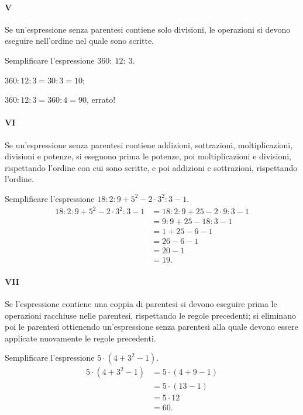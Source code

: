 \paragraph {V} Se un'espressione senza parentesi contiene solo divisioni, le operazioni si devono eseguire
nell'ordine nel quale sono scritte.
\begin{exrig}
 \begin{esempio}
 Semplificare l'espressione $360:~12:~3$.
 \begin{itemize*}
 \item $360:12:3=30:3=10$;
 \item $360:12:3=360:4=90$, errato!
\end{itemize*}
 \end{esempio}
\end{exrig}

\paragraph {VI} Se un'espressione senza parentesi contiene addizioni, sottrazioni, moltiplicazioni, divisioni e
potenze, si eseguono prima le potenze, poi moltiplicazioni e divisioni, rispettando l'ordine con cui sono
scritte, e poi addizioni e sottrazioni, rispettando l'ordine.
\pagebreak
\begin{exrig}
 \begin{esempio}
Semplificare l'espressione $18:2:9+5^2-2\cdot3^2:3-1$.
 \begin{align*}
 18:2:9+5^2-2\cdot3^2:3-1&=18:2:9+25-2\cdot 9:3-1\\
			 &=9:9+25-18:3-1\\
			 &=1+25-6-1\\
			 &=26-6-1\\
			 &=20-1\\
 &=19.
 \end{align*}
 \end{esempio}
\end{exrig}

\paragraph {VII} Se l'espressione contiene una coppia di parentesi si devono eseguire prima le operazioni
racchiuse nelle parentesi, rispettando le regole precedenti; si eliminano poi le parentesi ottienendo
un'espressione senza parentesi alla quale devono essere applicate nuovamente le regole precedenti.
\begin{exrig}
 \begin{esempio}
Semplificare l'espressione $5\cdot(4+3^2-1)$.
 \begin{align*}
 5\cdot(4+3^2-1)&=5\cdot(4+9-1)\\
		 &=5\cdot(13-1)\\
		 &=5\cdot 12\\
		 &=60.
 \end{align*}
\end{esempio}
\end{exrig}


